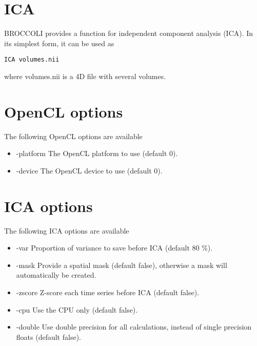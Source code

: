 \section{ICA}

BROCCOLI provides a function for independent component analysis (ICA). In its simplest form, it can be used as

\begin{verbatim}
ICA volumes.nii
\end{verbatim}
where volumes.nii is a 4D file with several volumes.

\section{OpenCL options}

The following OpenCL options are available

\begin{itemize}

\item -platform
\newline \newline The OpenCL platform to use (default 0).

\item -device
\newline \newline The OpenCL device to use (default 0).

\end{itemize}

\newpage 

\section{ICA options}

The following ICA options are available

\begin{itemize}

\item -var
\newline \newline Proportion of variance to save before ICA (default 80 \%).  

\item -mask
\newline \newline Provide a spatial mask (default false), otherwise a mask will automatically be created.

\item -zscore
\newline \newline Z-score each time series before ICA (default false). 

\item -cpu
\newline \newline Use the CPU only (default false).

\item -double
\newline \newline Use double precision for all calculations, instead of single precision floats (default false). 

\end{itemize}

